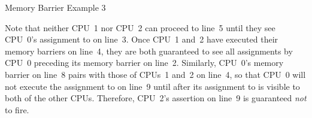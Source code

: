 \begin{listing*}
\scriptsize
{}
\caption{Memory Barrier Example 3}
\label{lst:app:whymb:Memory Barrier Example 3}
\end{listing*}


Note that neither CPU~1 nor CPU~2 can proceed to line~5 until they see
CPU~0's assignment to  on line~3.
Once CPU~1 and~2 have executed their memory barriers on line~4, they
are both guaranteed to see all assignments by CPU~0 preceding its memory
barrier on line~2.
Similarly, CPU~0's memory barrier on line~8 pairs with those of CPUs~1 and~2
on line~4, so that CPU~0 will not execute the assignment to  on
line~9 until after its assignment to  is visible to both of the
other CPUs.
Therefore, CPU~2's assertion on line~9 is guaranteed \emph{not} to fire.

